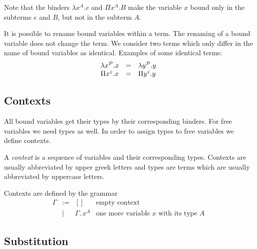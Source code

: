 Note that the binders $\lambda x^A. e$ and $\Pi x^A. B$ make the variable $x$
bound only in the subterms $e$ and $B$, but not in the subterm $A$.

It is possible to rename bound variables within a term. The renaming of a bound
variable does not change the term. We consider two terms which only differ in
the name of bound variables as identical. Examples of some identical terms:
$$
\begin{array}{lll}
    \lambda x^\Prop. x  &=& \lambda y^\Prop. y

    \\

    \Pi x^z. x   &=& \Pi y^z. y
\end{array}
$$






\subsection{Contexts}


All bound variables get their types by their corresponding binders. For free
variables we need types as well. In order to assign types to free variables we
define contexts.

\begin{definition}
    A \emph{context} is a sequence of variables and their corresponding types.
    Contexts are usually abbreviated by upper greek letters and types are terms
    which are usually abbreviated by uppercase letters.

    Contexts are defined by the grammar
    $$
    \begin{array}{llll}
        \Gamma
        &:=& [] & \text{empty context}

        \\

        &\mid& \Gamma, x^A & \text{one more variable $x$ with its type $A$}
    \end{array}
    $$
\end{definition}







\subsection{Substitution}


